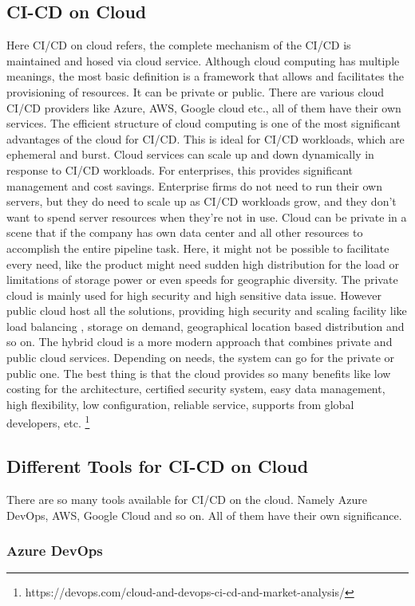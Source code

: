 %
\subsection{CI-CD on Cloud}
%
Here CI/CD on cloud refers, the complete mechanism of the CI/CD is maintained and hosed via cloud service. Although cloud computing has multiple meanings, the most basic definition is a framework that allows and facilitates the provisioning of resources. It can be private or public. There are various cloud CI/CD providers like Azure, AWS, Google cloud etc., all of them have their own services\cite{inproceedings}. The efficient structure of cloud computing is one of the most significant advantages of the cloud for CI/CD. This is ideal for CI/CD workloads, which are ephemeral and burst. Cloud services can scale up and down dynamically in response to CI/CD workloads. For enterprises, this provides significant management and cost savings. Enterprise firms do not need to run their own servers, but they do need to scale up as CI/CD workloads grow, and they don't want to spend server resources when they're not in use. Cloud can be private in a scene that if the company has own data center and all other resources to accomplish the entire pipeline task. Here, it might not be possible to facilitate every need, like the product might need sudden high distribution for the load or limitations of storage power or even speeds for geographic diversity. The private cloud is mainly used for high security and high sensitive data issue. However public cloud host all the solutions, providing high security and scaling facility like load balancing , storage on demand, geographical location based distribution and so on. The hybrid cloud is a more modern approach that combines private and public cloud services. Depending on needs, the system can go for the private or public one. The best thing is that the cloud provides so many benefits like low costing for the architecture, certified security system, easy data management, high flexibility, low configuration, reliable service, supports from global developers, etc. 
\footnote{https://devops.com/cloud-and-devops-ci-cd-and-market-analysis/}
%
\subsection{Different Tools for CI-CD on Cloud}
%
There are so many tools available for CI/CD on the cloud. Namely Azure DevOps, AWS, Google Cloud and so on. All of them have their own significance. 
%
\subsubsection{Azure DevOps}
%

